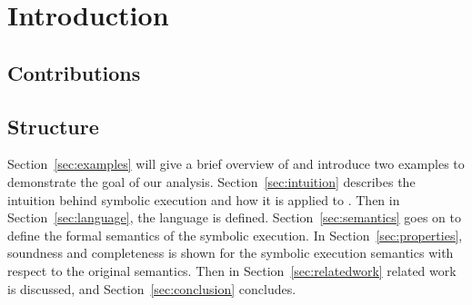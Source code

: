 


\section{Introduction}


\subsection{Contributions}

\subsection{Structure}
Section~\ref{sec:examples} will give a brief overview of \TOPHAT and introduce two examples to demonstrate the goal of our analysis.
Section~\ref{sec:intuition} describes the intuition behind symbolic execution and how it is applied to \TOPHAT.
Then in Section~\ref{sec:language}, the \TOPHAT language is defined.
Section~\ref{sec:semantics} goes on to define the formal semantics of the symbolic execution.
In Section~\ref{sec:properties}, soundness and completeness is shown for the symbolic execution semantics with respect to the original \TOPHAT semantics.
Then in Section~\ref{sec:relatedwork} related work is discussed, and Section~\ref{sec:conclusion} concludes.
